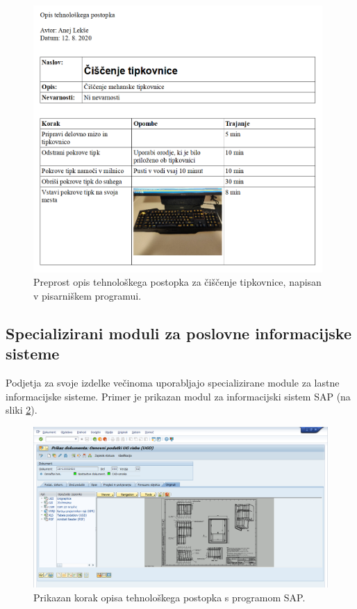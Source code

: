 \documentclass[a4paper, 12pt]{book}
\begin{document}
\begin{figure}[H]
\begin{center}
\includegraphics[width=11cm]{report_writer}
\end{center}
\caption{Preprost opis tehnološkega postopka za čiščenje tipkovnice, napisan v pisarniškem programui.}
\label{report_writer}
\end{figure}

\subsection{Specializirani moduli za poslovne informacijske sisteme}

Podjetja za svoje izdelke večinoma uporabljajo specializirane module za lastne informacijske sisteme.
Primer je prikazan modul za informacijski sistem SAP (na sliki \ref{sap_1}).

\begin{figure}[H]
\begin{center}
\includegraphics[width=13cm]{sap_1}
\end{center}
\caption{Prikazan korak opisa tehnološkega postopka s programom SAP.}
\label{sap_1}
\end{figure}
\end{document}
